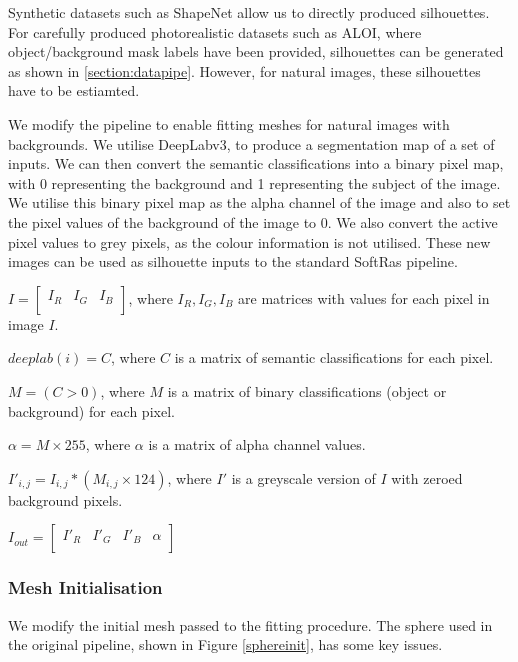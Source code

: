 \documentclass{article}
\begin{document}
Synthetic datasets such as ShapeNet allow us to directly produced silhouettes. For carefully produced photorealistic datasets such as ALOI, where object/background mask labels have been provided, silhouettes can be generated as shown in \ref{section:datapipe}. However, for natural images, these silhouettes have to be estiamted.

We modify the pipeline to enable fitting meshes for natural images with backgrounds. We utilise DeepLabv3, to produce a segmentation map of a set of inputs. We can then convert the semantic classifications into a binary pixel map, with 0 representing the background and 1 representing the subject of the image. We utilise this binary pixel map as the alpha channel of the image and also to set the pixel values of the background of the image to 0. We also convert the active pixel values to grey pixels, as the colour information is not utilised. These new images can be used as silhouette inputs to the standard SoftRas pipeline.

\noindent$
  I = 
  \begin{bmatrix}
    I_R & I_G & I_B\\
  \end{bmatrix}
$, where $I_R, I_G, I_B$ are matrices with values for each pixel in image $I$.

\noindent$deeplab(i) = C$, where $C$ is a matrix of semantic classifications for each pixel.

\noindent$M = (C > 0)$, where $M$ is a matrix of binary classifications (object or background) for each pixel.

\noindent$\alpha = M \times 255$, where $\alpha$ is a matrix of alpha channel values.

\noindent$I'_{i,j} = I_{i,j} * (M_{i,j} \times 124)$, where $I'$ is a greyscale version of $I$ with zeroed background pixels.

\noindent$
  I_{out} =  
  \begin{bmatrix}
    I'_R & I'_G & I'_B & \alpha\\
  \end{bmatrix}
$

\subsubsection{Mesh Initialisation}
\label{section:meshimp}
We modify the initial mesh passed to the fitting procedure. The sphere used in the original pipeline, shown in Figure \ref{sphereinit}, has some key issues.
\end{document}
